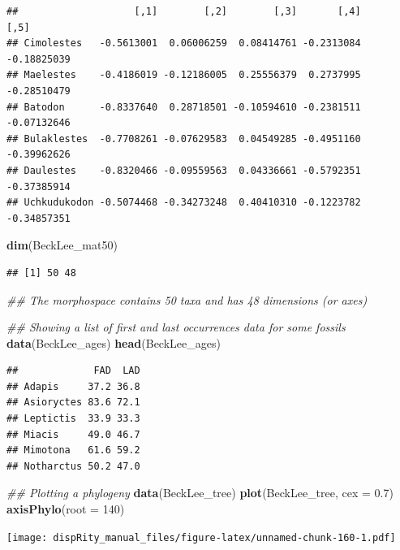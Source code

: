 \documentclass[]{book}
\newenvironment{Shaded}{\begin{snugshade}}{\end{snugshade}}
\newcommand{\CommentTok}[1]{\textcolor[rgb]{0.56,0.35,0.01}{\textit{#1}}}
\newcommand{\DataTypeTok}[1]{\textcolor[rgb]{0.13,0.29,0.53}{#1}}
\newcommand{\DecValTok}[1]{\textcolor[rgb]{0.00,0.00,0.81}{#1}}
\newcommand{\FloatTok}[1]{\textcolor[rgb]{0.00,0.00,0.81}{#1}}
\newcommand{\KeywordTok}[1]{\textcolor[rgb]{0.13,0.29,0.53}{\textbf{#1}}}
\newcommand{\NormalTok}[1]{#1}
\begin{document}
\begin{verbatim}
##                    [,1]        [,2]        [,3]       [,4]        [,5]
## Cimolestes   -0.5613001  0.06006259  0.08414761 -0.2313084 -0.18825039
## Maelestes    -0.4186019 -0.12186005  0.25556379  0.2737995 -0.28510479
## Batodon      -0.8337640  0.28718501 -0.10594610 -0.2381511 -0.07132646
## Bulaklestes  -0.7708261 -0.07629583  0.04549285 -0.4951160 -0.39962626
## Daulestes    -0.8320466 -0.09559563  0.04336661 -0.5792351 -0.37385914
## Uchkudukodon -0.5074468 -0.34273248  0.40410310 -0.1223782 -0.34857351
\end{verbatim}

\begin{Shaded}
\begin{Highlighting}[]
\KeywordTok{dim}\NormalTok{(BeckLee_mat50)}
\end{Highlighting}
\end{Shaded}

\begin{verbatim}
## [1] 50 48
\end{verbatim}

\begin{Shaded}
\begin{Highlighting}[]
\CommentTok{## The morphospace contains 50 taxa and has 48 dimensions (or axes)}

\CommentTok{## Showing a list of first and last occurrences data for some fossils}
\KeywordTok{data}\NormalTok{(BeckLee_ages)}
\KeywordTok{head}\NormalTok{(BeckLee_ages)}
\end{Highlighting}
\end{Shaded}

\begin{verbatim}
##             FAD  LAD
## Adapis     37.2 36.8
## Asioryctes 83.6 72.1
## Leptictis  33.9 33.3
## Miacis     49.0 46.7
## Mimotona   61.6 59.2
## Notharctus 50.2 47.0
\end{verbatim}

\begin{Shaded}
\begin{Highlighting}[]
\CommentTok{## Plotting a phylogeny}
\KeywordTok{data}\NormalTok{(BeckLee_tree)}
\KeywordTok{plot}\NormalTok{(BeckLee_tree, }\DataTypeTok{cex =} \FloatTok{0.7}\NormalTok{)}
\KeywordTok{axisPhylo}\NormalTok{(}\DataTypeTok{root =} \DecValTok{140}\NormalTok{)}
\end{Highlighting}
\end{Shaded}

\texttt{[image: dispRity\_manual\_files/figure-latex/unnamed-chunk-160-1.pdf]}
\end{document}
